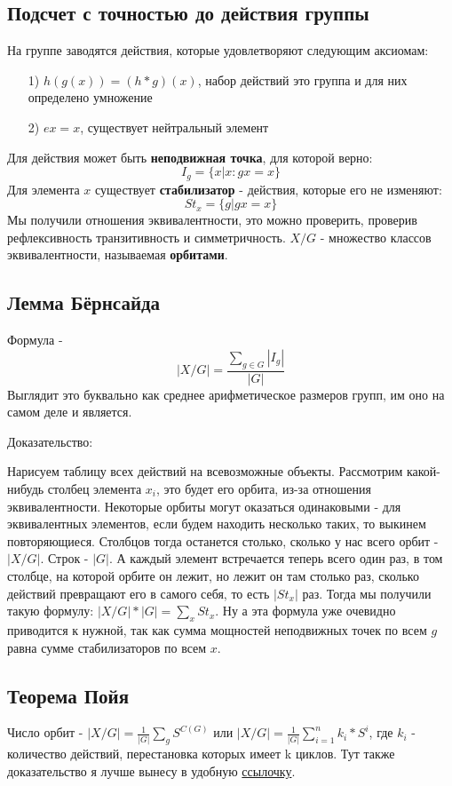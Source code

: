 
\subsection{Подсчет с точностью до действия группы}
На группе заводятся действия, которые удовлетворяют следующим аксиомам:
\begin{enumerate}
    \item[1)] $h(g(x))=(h*g)(x)$, набор действий это группа и для них определено умножение
    \item[2)] $ex=x$, существует нейтральный элемент
\end{enumerate}
Для действия может быть \textbf{неподвижная точка}, для которой верно:$$I_g=\{x|x : gx=x\}$$
Для элемента $x$ существует \textbf{стабилизатор} - действия, которые его не изменяют:$$St_x = \{g|gx=x\}$$
Мы получили отношения эквивалентности, это можно проверить, проверив рефлексивность транзитивность и симметричность.
$X/G$ - множество классов эквивалентности, называемая \textbf{орбитами}.
\subsection{Лемма Бёрнсайда}
Формула - $$\displaystyle\left|X/G\right|=\frac{\sum\limits_{g\in G}|I_g|}{|G|}$$ Выглядит это буквально как среднее арифметическое размеров групп, им оно на самом деле и является.

Доказательство:

Нарисуем таблицу всех действий на всевозможные объекты. Рассмотрим какой-нибудь столбец элемента $x_i$, это будет его орбита, из-за отношения эквивалентности. Некоторые орбиты могут оказаться одинаковыми - для эквивалентных элементов, если будем находить несколько таких, то выкинем повторяющиеся. Столбцов тогда останется столько, сколько у нас всего орбит - $|X/G|$. Строк - $|G|$. А каждый элемент встречается теперь всего один раз, в том столбце, на которой орбите он лежит, но лежит он там столько раз, сколько действий превращают его в самого себя, то есть $|St_x|$ раз. Тогда мы получили такую формулу: $|X/G|*|G|=\sum\limits_x{St_x}$. Ну а эта формула уже очевидно приводится к нужной, так как сумма мощностей неподвижных точек по всем $g$ равна сумме стабилизаторов по всем $x$.  
\subsection{Теорема Пойя}
Число орбит - $|X/G| = \frac{1}{|G|}\sum\limits_g{S^{C(G)}}$ или $|X/G| = \frac{1}{|G|}\sum\limits_{i=1}^n{k_i*S^{i}}$, где $k_i$ - количество действий, перестановка которых имеет k циклов. 
Тут также доказательство я лучше вынесу в удобную \href{https://neerc.ifmo.ru/wiki/index.php?title=%D0%9B%D0%B5%D0%BC%D0%BC%D0%B0_%D0%91%D1%91%D1%80%D0%BD%D1%81%D0%B0%D0%B9%D0%B4%D0%B0_%D0%B8_%D0%A2%D0%B5%D0%BE%D1%80%D0%B5%D0%BC%D0%B0_%D0%9F%D0%BE%D0%B9%D0%B0}{ссылочку}.
